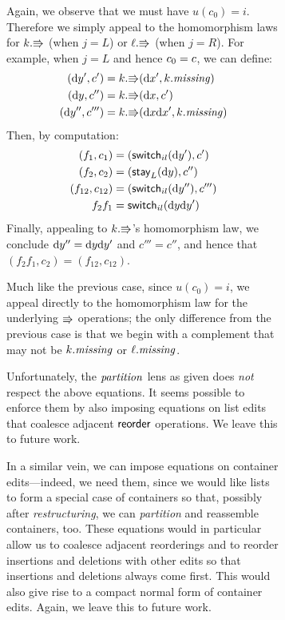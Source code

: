 \begin{figure}
\begin{figure}
\begin{pf}
\begin{trivlist}
 Again, we observe
            that we must have $u(c_0)=i$. Therefore we simply appeal to the
            homomorphism laws
            for $k.\mathord{\Rrightarrow}$ (when $j=L$) or $\ell.\mathord{\Rrightarrow}$ (when $j=R$). For
            example, when $j=L$ and hence $c_0= c$, we can define:
            \begin{align*}
                (\textrm{d} y',c') &= k.\mathord{\Rrightarrow}(\textrm{d} x',k.\mathit{missing}) \\
                (\textrm{d} y,c'') &= k.\mathord{\Rrightarrow}(\textrm{d} x,c') \\
                (\textrm{d} y'',c''') &= k.\mathord{\Rrightarrow}(\textrm{d} x\textrm{d} x',k.\mathit{missing})
            \end{align*}
            Then, by computation:
            \begin{align*}
                (f_1,c_1) &= (\mathsf{switch}_{il}(\textrm{d} y'),{c'}) \\
                (f_2,c_2) &= (\mathsf{stay}_L(\textrm{d} y),{c''}) \\
                (f_{12},c_{12}) &= (\mathsf{switch}_{il}(\textrm{d} y''),{c'''}) \\
                f_2f_1 &= \mathsf{switch}_{il}(\textrm{d} y\textrm{d} y')
            \end{align*}
            Finally, appealing to $k.\mathord{\Rrightarrow}$'s homomorphism law, we conclude
            $\textrm{d} y''=\textrm{d} y\textrm{d} y'$ and $c'''=c''$, and hence that
            $(f_2f_1,c_2)=(f_{12},c_{12})$.

 Much like the
            previous case, since $u(c_0)=i$, we appeal directly to the
            homomorphism law for the underlying $\mathord{\Rrightarrow}$ operations; the
            only difference from the previous case is that we begin with a
            complement that may not be $k.\mathit{missing}$ or $\ell.\mathit{missing}$.
\fi
    \endofpf
    \end{trivlist}
\end{pf}
\fi

Unfortunately, the $\mathit{partition}$ lens as given does {\em not} respect the
above equations.  It seems possible to enforce them by also imposing
equations on list edits that coalesce adjacent $\mathsf{reorder}$ operations. We
leave this to future work.

In a similar vein, we can impose equations on container edits---indeed, we
need them, since we would like lists to form a
special case of containers so that, possibly after
\emph{restructuring}, we can \emph{partition} and reassemble
containers, too. These equations would in particular allow us to
coalesce adjacent reorderings and to reorder insertions and
deletions with other edits so that insertions and deletions
always come first. This would also give rise to a compact normal
form of container edits. Again, we leave this to future work. 


\end{figure}
\end{figure}
